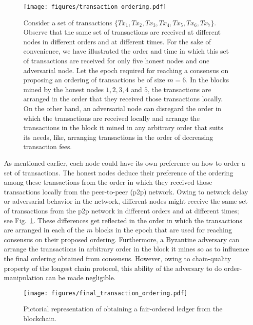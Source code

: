 \documentclass{article}
\begin{document}
\begin{figure}
    \centering
    \texttt{[image: figures/transaction\_ordering.pdf]}
    \caption{Consider a set of transactions $\{Tx_1, Tx_2, Tx_3, Tx_4, Tx_5, Tx_6, Tx_7\}$. Observe that the same set of transactions are received at different nodes in different orders and at different times. For the sake of convenience, we have illustrated the order and time in which this set of transactions are received for only five honest nodes and one adversarial node. Let the epoch required for reaching a consensus on proposing an ordering of transactions be of size $m=6$. In the blocks mined by the honest nodes $1,2,3,4$ and $5$, the transactions are arranged in the order that they received those transactions locally. On the other hand, an adversarial node can disregard the order in which the transactions are received locally and arrange the transactions in the block it mined in any arbitrary order that suits its needs, like, arranging transactions in the order of decreasing transaction fees.}
    \label{fig:transaction-ordering}
\end{figure}
As mentioned earlier, each node could have its own preference on how to order a set of transactions. The honest nodes deduce their preference of the ordering among these transactions from the order in which they received those transactions locally from the peer-to-peer (p2p) network. Owing to network delay or  adversarial behavior in the network, different nodes might receive the same set of transactions from the p2p network in different orders and at different times; see Fig.~\ref{fig:transaction-ordering}. These differences get reflected in the order in which the transactions are arranged in each of the $m$ blocks in the epoch that are used for reaching consensus on their proposed ordering. Furthermore, a Byzantine adversary can arrange the transactions in arbitrary order in the block it mines so as to influence the final ordering obtained from consensus. However, owing to chain-quality property of the longest chain protocol, this ability of the adversary to do order-manipulation can be made negligible.



\begin{figure}
    \centering
    \texttt{[image: figures/final\_transaction\_ordering.pdf]}
    \caption{Pictorial representation of obtaining a fair-ordered ledger from the blockchain.}
    \label{fig:final-transaction-ordering}
\end{figure}
\end{document}

